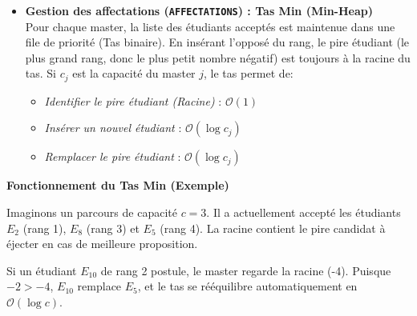 \documentclass{article}
\begin{document}
\begin{itemize}
    \item \textbf{Gestion des affectations (\texttt{AFFECTATIONS}) : Tas Min (Min-Heap)} \\
    Pour chaque master, la liste des étudiants acceptés est maintenue dans une file de priorité (Tas binaire). En insérant l'opposé du rang, le pire étudiant (le plus grand rang, donc le plus petit nombre négatif) est toujours à la racine du tas. Si $c_j$ est la capacité du master $j$, le tas permet de:
    \begin{itemize}
        \item \textit{Identifier le pire étudiant (Racine)} : $\mathcal{O}(1)$
        \item \textit{Insérer un nouvel étudiant} : $\mathcal{O}(\log c_j)$
        \item \textit{Remplacer le pire étudiant} : $\mathcal{O}(\log c_j)$
    \end{itemize}
\end{itemize}

\vspace{0.5cm}
\noindent\textbf{Fonctionnement du Tas Min (Exemple)}

Imaginons un parcours de capacité $c = 3$. Il a actuellement accepté les étudiants $E_2$ (rang 1), $E_8$ (rang 3) et $E_5$ (rang 4). La racine contient le pire candidat à éjecter en cas de meilleure proposition.

\begin{center}
\end{center}

Si un étudiant $E_{10}$ de rang 2 postule, le master regarde la racine (-4). Puisque $-2 > -4$, $E_{10}$ remplace $E_5$, et le tas se rééquilibre automatiquement en $\mathcal{O}(\log c)$.

\begin{center}
\end{center}
\end{document}

